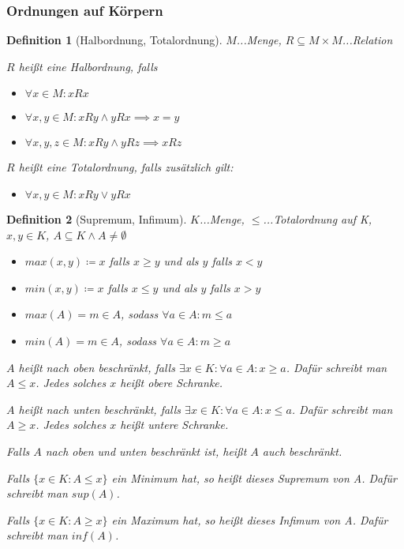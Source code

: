 \documentclass[twocolumn]{article}
\newtheorem{definition}{Definition}[section]
\begin{document}
\subsubsection{Ordnungen auf Körpern}
\begin{definition}[Halbordnung, Totalordnung]
	$M$...Menge, $R \subseteq M \times M$...Relation
	
	$R$ heißt eine Halbordnung, falls
	\begin{itemize}
		\item $\forall x \in M : xRx$
		\item $\forall x,y \in M : xRy \land yRx \implies x = y$
		\item $\forall x,y,z \in M : xRy \land yRz \implies xRz$
	\end{itemize}

	$R$ heißt eine Totalordnung, falls zusätzlich gilt:
	\begin{itemize}
		\item $\forall x,y \in M : xRy \lor yRx$
	\end{itemize}
\end{definition}

\begin{definition}[Supremum, Infimum]
	$K$...Menge, $\leq$...Totalordnung auf K, $x,y \in K$, $A \subseteq K \land A \neq \emptyset$
	
	\begin{itemize}
		\item $max(x,y)\coloneqq x$ falls $x \geq y$ und als $y$ falls $x < y$
		\item $min(x,y)\coloneqq x$ falls $x \leq y$ und als $y$ falls $x > y$
		\item $max(A) = m \in A$, sodass $\forall a \in A : m \leq a$
		\item $min(A) = m \in A$, sodass $\forall a \in A : m \geq a$
	\end{itemize}

	$A$ heißt nach oben beschränkt, falls $\exists x \in K : \forall a \in A : x \geq a$. Dafür schreibt man $A \leq x$. Jedes solches $x$ heißt obere Schranke.
	
	$A$ heißt nach unten beschränkt, falls $\exists x \in K : \forall a \in A : x \leq a$. Dafür schreibt man $A \geq x$. Jedes solches $x$ heißt untere Schranke.
	
	Falls $A$ nach oben und unten beschränkt ist, heißt $A$ auch beschränkt.
	
	Falls $\{x \in K : A \leq x\}$ ein Minimum hat, so heißt dieses Supremum von A. Dafür schreibt man $sup(A)$.
	
	Falls $\{x \in K : A \geq x\}$ ein Maximum hat, so heißt dieses Infimum von A. Dafür schreibt man $inf(A)$.
\end{definition}
\end{document}
